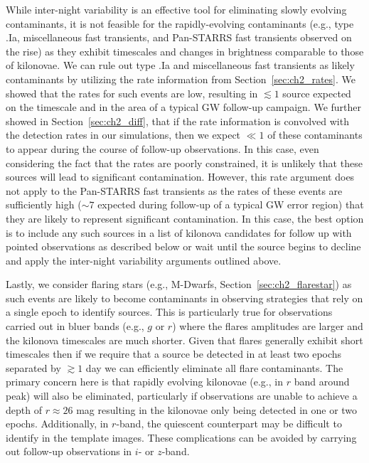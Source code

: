 While inter-night variability is an effective tool for eliminating slowly evolving contaminants, it is not feasible for the rapidly-evolving contaminants (e.g., type .Ia, miscellaneous fast transients, and Pan-STARRS fast transients observed on the rise) as they exhibit timescales and changes in brightness comparable to those of kilonovae. We can rule out type .Ia and miscellaneous fast transients as likely contaminants by utilizing the rate information from Section~\ref{sec:ch2_rates}. We showed that the rates for such events are low, resulting in $\lesssim1$ source expected on the timescale and in the area of a typical GW follow-up campaign. We further showed in Section~\ref{sec:ch2_diff}, that if the rate information is convolved with the detection rates in our simulations, then we expect $\ll 1$ of these contaminants to appear during the course of follow-up observations. In this case, even considering the fact that the rates are poorly constrained, it is unlikely that these sources will lead to significant contamination. However, this rate argument does not apply to the Pan-STARRS fast transients as the rates of these events are sufficiently high ($\sim 7$ expected during follow-up of a typical GW error region) that they are likely to represent significant contamination. In this case, the best option is to include any such sources in a list of kilonova candidates for follow up with pointed observations as described below or wait until the source begins to decline and apply the inter-night variability arguments outlined above.

Lastly, we consider flaring stars (e.g., M-Dwarfs, Section~\ref{sec:ch2_flarestar}) as such events are likely to become contaminants in observing strategies that rely on a single epoch to identify sources. This is particularly true for observations carried out in bluer bands (e.g., $g$ or $r$) where the flares amplitudes are larger and the kilonova timescales are much shorter. Given that flares generally exhibit short timescales \citep[minutes to hours][]{Berger+13} then if we require that a source be detected in at least two epochs separated by $\gtrsim1$ day we can efficiently eliminate all flare contaminants. The primary concern here is that rapidly evolving kilonovae (e.g., in $r$ band around peak) will also be eliminated, particularly if observations are unable to achieve a depth of $r\approx26$ mag resulting in the kilonovae only being detected in one or two epochs. Additionally, in $r$-band, the quiescent counterpart may be difficult to identify in the template images. These complications can be avoided by carrying out follow-up observations in $i$- or $z$-band.

